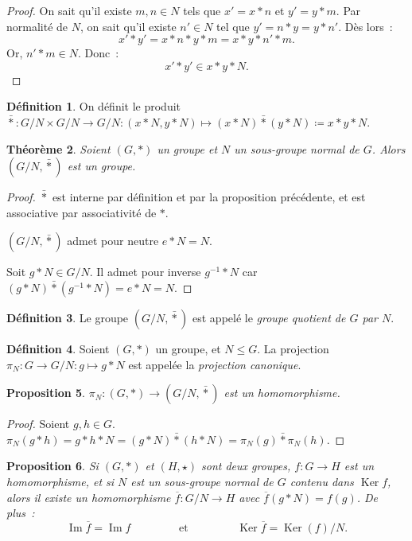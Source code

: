 \documentclass{article}
\newtheorem{thm}{Théorème}[section]
\newtheorem{prp}[thm]{Proposition}
\theoremstyle{definition}
\newtheorem{déf}[thm]{Définition}
\theoremstyle{remark}
\DeclareMathOperator{\Imf}{Im}
\DeclareMathOperator{\Ker}{Ker}
\begin{document}
		\begin{proof} On sait qu'il existe $m, n \in N$ tels que $x' = x*n$ et $y' = y*m$. Par normalité de $N$, on sait qu'il existe $n' \in N$ tel que
		$y' = n*y = y*n'$. Dès lors~:
		\[x'*y' = x*n*y*m = x*y*n'*m.\]
		Or, $n'*m \in N$. Donc~:
		\[x'*y' \in x*y*N.\]
		\end{proof}

		\begin{déf} On définit le produit $\bar * : G/N \times G/N \to G/N : (x*N, y*N) \mapsto (x*N) \bar * (y*N) \coloneqq x*y*N$.
		\end{déf}

		\begin{thm} Soient $(G, *)$ un groupe et $N$ un sous-groupe normal de $G$. Alors $(G/N, \bar *)$ est un groupe.
		\end{thm}

		\begin{proof} $\bar *$ est interne par définition et par la proposition précédente, et est associative par associativité de $*$.

		$(G/N, \bar *)$ admet pour neutre $e*N = N$.

		Soit $g*N \in G/N$. Il admet pour inverse $g^{-1}*N$ car $(g*N) \bar * (g^{-1}*N) = e*N = N$.
		\end{proof}

		\begin{déf} Le groupe $(G/N, \bar *)$ est appelé le \textit{groupe quotient de $G$ par $N$}.
		\end{déf}

		\begin{déf} Soient $(G, *)$ un groupe, et $N \leq G$. La projection $\pi_N : G \to G/N : g \mapsto g*N$ est appelée la \textit{projection canonique}.
		\end{déf}

		\begin{prp} $\pi_N : (G, *) \to (G/N, \bar *)$ est un homomorphisme.
		\end{prp}

		\begin{proof} Soient $g, h \in G$. $\pi_N(g*h) = g*h*N = (g*N) \bar * (h*N) = \pi_N(g) \bar * \pi_N(h)$.
		\end{proof}

		\begin{prp} Si $(G, *)$ et $(H, \star)$ sont deux groupes, $f : G \to H$ est un homomorphisme, et si $N$ est un sous-groupe normal de $G$ contenu dans
		$\Ker f$, alors il existe un homomorphisme $\overline f : G/N \to H$ avec $\overline f(g*N) = f(g)$. De plus~:
		\[\Imf \overline f = \Imf f \qquad\qquad \text{ et } \qquad\qquad \Ker \overline f = \Ker(f)/N.\]
		\end{prp}
\end{document}

